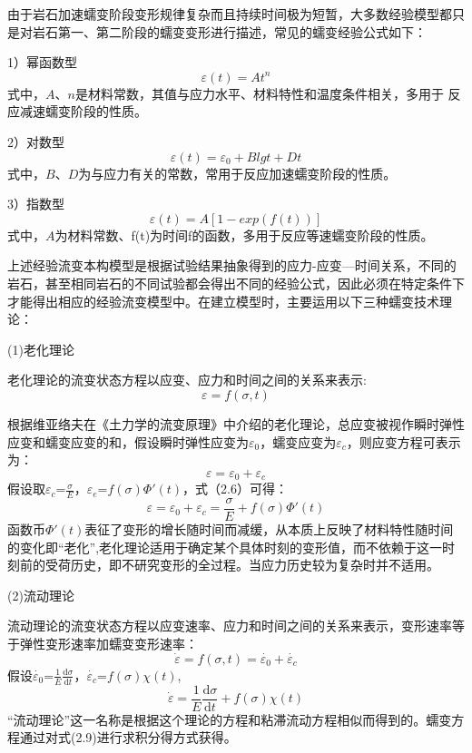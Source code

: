 由于岩石加速蠕变阶段变形规律复杂而且持续时间极为短暂，大多数经验模型都只是对岩石第一、第二阶段的蠕变变形进行描述，常见的蠕变经验公式如下：

1）幂函数型
\begin{equation}
     {\varepsilon}(t)=At^n
\end{equation}
式中，$A$、$n$是材料常数，其值与应力水平、材料特性和温度条件相关，多用于
反应减速蠕变阶段的性质。

2）对数型
\begin{equation}
     {\varepsilon}(t)={\varepsilon}_{0}+Blgt+Dt
\end{equation}
式中，$B$、$D$为与应力有关的常数，常用于反应加速蠕变阶段的性质。

3）指数型
\begin{equation}
     {\varepsilon}(t)=A[1-exp(f(t))]
\end{equation}
式中，$A$为材料常数、f(t)为时间f的函数，多用于反应等速蠕变阶段的性质。


上述经验流变本构模型是根据试验结果抽象得到的应力-应变—时间关系，不同的岩石，甚至相同岩石的不同试验都会得出不同的经验公式，因此必须在特定条件下才能得出相应的经验流变模型中。在建立模型时，主要运用以下三种蠕变技术理论：

(1)老化理论

老化理论的流变状态方程以应变、应力和时间之间的关系来表示:
\begin{equation}
     {\varepsilon}=f({\sigma},{t})
\end{equation}

根据维亚络夫在《土力学的流变原理》中介绍的老化理论，总应变被视作瞬时弹性应变和蠕变应变的和，假设瞬时弹性应变为$\varepsilon_0$，蠕变应变为$\varepsilon_c$，则应变方程可表示为：
\begin{equation}
     {\varepsilon}={\varepsilon_0}+{\varepsilon_c}
\end{equation}
假设取$\varepsilon_c$=$\frac{\sigma}{E}$，$\varepsilon_e$=$f(\sigma){\Phi}'(t)$，式（2.6）可得：
\begin{equation}
     {\varepsilon}={\varepsilon_0}+{\varepsilon_c}=\frac{\sigma}{E}+f(\sigma){\Phi}'(t)
\end{equation}
函数币${\Phi}'(t)$表征了变形的增长随时间而减缓，从本质上反映了材料特性随时间的变化即“老化”,老化理论适用于确定某个具体时刻的变形值，而不依赖于这一时刻前的受荷历史，即不研究变形的全过程。当应力历史较为复杂时并不适用。

(2)流动理论

流动理论的流变状态方程以应变速率、应力和时间之间的关系来表示，变形速率等于弹性变形速率加蠕变变形速率：
\begin{equation}
     {\dot{\varepsilon}}=f({\sigma},{t})={\dot{\varepsilon_0}}+{\dot{\varepsilon_c}}
\end{equation}
假设$\dot{\varepsilon_0}$=$\frac{1}{E}\frac{\mathrm{d} \sigma}{\mathrm{d} t}
$，$\dot{\varepsilon_c}$=$f(\sigma)\chi(t)$,
\begin{equation}
     {\dot{\varepsilon}}=\frac{1}{E}\frac{\mathrm{d} \sigma}{\mathrm{d} t}+f(\sigma)\chi(t)
\end{equation}
“流动理论”这一名称是根据这个理论的方程和粘滞流动方程相似而得到的。蠕变方程通过对式(2.9)进行求积分得方式获得。

